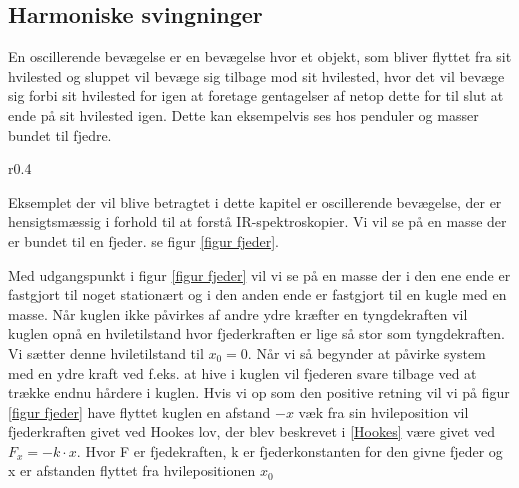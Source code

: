 \subsection{Harmoniske svingninger}\label{teori: Harmoniske svingninger}
En oscillerende bevægelse er en bevægelse hvor et objekt, som bliver flyttet fra sit hvilested og sluppet vil bevæge sig tilbage mod sit hvilested, hvor det vil bevæge sig forbi sit hvilested for igen at foretage gentagelser af netop dette for til slut at ende på sit hvilested igen. Dette kan eksempelvis ses hos penduler og masser bundet til fjedre.
\\

\begin{wrapfigure}{r}{0.4\textwidth}
\centering

\caption{Fjeder der trækkes i}
\label{figur fjeder}
\end{wrapfigure} 

Eksemplet der vil blive betragtet i dette kapitel er oscillerende bevægelse, der er hensigtsmæssig i forhold til at forstå IR-spektroskopier. Vi vil se på en masse der er bundet til en fjeder. se figur \ref{figur fjeder}.

Med udgangspunkt i figur \ref{figur fjeder} vil vi se på en masse der i den ene ende er fastgjort til noget stationært og i den anden ende er fastgjort til en kugle med en masse. Når kuglen ikke påvirkes af andre ydre kræfter en tyngdekraften vil kuglen opnå en hviletilstand hvor fjederkraften er lige så stor som tyngdekraften. Vi sætter denne hviletilstand til $x_0=0$. Når vi så begynder at påvirke system med en ydre kraft ved f.eks. at hive i kuglen vil fjederen svare tilbage ved at trække endnu hårdere i kuglen. Hvis vi op som den positive retning vil vi på figur \ref{figur fjeder} have flyttet kuglen en afstand $-x$ væk fra sin hvileposition vil fjederkraften givet ved Hookes lov, der blev beskrevet i \ref{Hookes} være givet ved $F_x=-k \cdot x$. Hvor F er fjedekraften, k er fjederkonstanten for den givne fjeder og x er afstanden flyttet fra hvilepositionen $x_0$